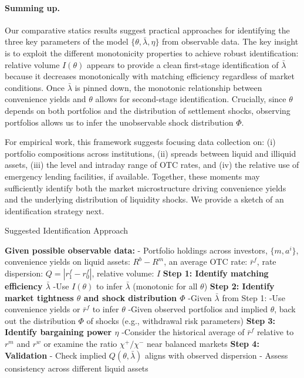 \documentclass[12pt,american,english,notitlepage]{article}
\begin{document}
\paragraph*{
Summing up.}

Our comparative statics results suggest practical approaches for identifying
the three key parameters of the model $\{\theta,\bar{\lambda},\eta\}$
from observable data. The key insight is to exploit the different
monotonicity properties to achieve robust identification: relative
volume $I(\theta)$ appears to provide a clean first-stage identification
of $\bar{\lambda}$ because it decreases monotonically with matching
efficiency regardless of market conditions. Once $\bar{\lambda}$
is pinned down, the monotonic relationship between convenience yields
and $\theta$ allows for second-stage identification. Crucially, since
$\theta$ depends on both portfolios and the distribution of settlement
shocks, observing portfolios allows us to infer the unobservable shock
distribution $\Phi$.

For empirical work, this framework suggests focusing data collection
on: (i) portfolio compositions across institutions, (ii) spreads between
liquid and illiquid assets, (iii) the level and intraday range of
OTC rates, and (iv) the relative use of emergency lending facilities,
if available. Together, these moments may sufficiently identify both the market microstructure driving convenience yields and the underlying
distribution of liquidity shocks. We provide a sketch of an identification
strategy next.

\begin{algorithm*}[htb]
\caption{Suggested Identification Approach}
\vspace{10pt}
\begin{algorithmic}
\STATE \textbf{Given possible observable data:}
\STATE \quad - Portfolio holdings across investors, $\{m,a^i\}$, convenience yields on liquid assets: $R^b - R^m$, an average OTC rate: $\bar{r}^f$, rate dispersion: $Q = |r^f_1 - r^f_0|$,  relative volume: $I$
\STATE
\STATE \textbf{Step 1: Identify matching efficiency $\bar{\lambda}$}
\STATE \quad -Use $I(\theta)$ to infer $\bar{\lambda}$ (monotonic for all $\theta$)
\STATE
\STATE \textbf{Step 2: Identify market tightness $\theta$ and shock distribution $\Phi$}
\STATE \quad -Given $\bar{\lambda}$ from Step 1:
\STATE \quad -Use convenience yields or $\bar{r}^f$ to infer $\theta$  
\STATE \quad -Given observed portfolios and implied $\theta$, back out the distribution $\Phi$ of shocks (e.g., withdrawal risk parameters)
\STATE
\STATE \textbf{Step 3: Identify bargaining power $\eta$}
\STATE \quad -Consider the historical average of $\bar{r}^f$ relative to $r^m$ and $r^w$
\STATE \quad or examine the ratio $\chi^+/\chi^-$ near balanced markets
\STATE
\STATE \textbf{Step 4: Validation}
\STATE \quad - Check implied $Q(\theta,\bar{\lambda})$ aligns with observed dispersion
\STATE \quad - Assess consistency across different liquid assets
\end{algorithmic}
\end{algorithm*}
\end{document}
